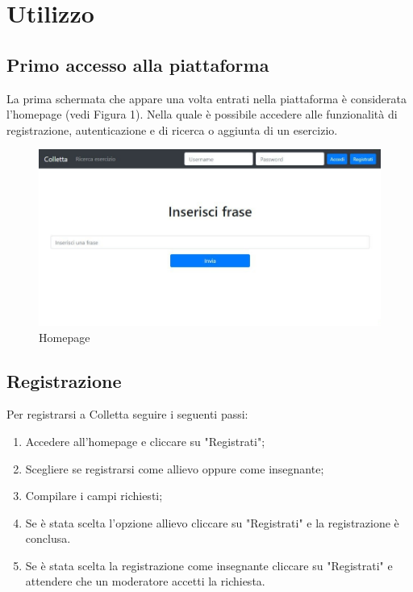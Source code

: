 \documentclass[11pt,a4paper]{article}
\begin{document}
{ \newpage
	\section{Utilizzo}	
	
	\subsection{Primo accesso alla piattaforma}
	La prima schermata che appare una volta entrati nella piattaforma è considerata l'homepage (vedi Figura 1). Nella quale è possibile accedere alle funzionalità di registrazione, autenticazione e di ricerca o aggiunta di un esercizio.
	
	\begin{figure}[h]
		\centering
		\includegraphics[scale=0.65]{images/home.jpg}
		\caption{Homepage}
	\end{figure}
	
	\subsection{Registrazione}
	Per registrarsi a Colletta seguire i seguenti passi:
	\begin{enumerate}
	\item Accedere all'homepage e cliccare su "Registrati";
	\item Scegliere se registrarsi come allievo oppure come insegnante;
	\item Compilare i campi richiesti;
	\item Se è stata scelta l'opzione allievo cliccare su "Registrati" e la registrazione è conclusa.
	\item Se è stata scelta la registrazione come insegnante cliccare su "Registrati" e attendere che un moderatore accetti la richiesta.
	\end{enumerate}

}
\end{document}
